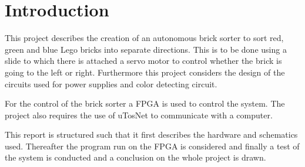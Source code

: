 
\section{Introduction}

This project describes the creation of an autonomous brick sorter to sort red, green and blue Lego bricks into separate directions.
This is to be done using a slide to which there is attached a servo motor to control whether the brick is going to the left or right.
Furthermore this project considers the design of the circuits used for power supplies and   color detecting circuit.

For the control of the brick sorter a FPGA is used to control the system.
The project also requires the use of uTosNet to communicate with a computer.

This report is structured such that it first describes the hardware and schematics used.
Thereafter the program run on the FPGA is considered and finally a test of the system is conducted and a conclusion on the whole project is drawn.




	
